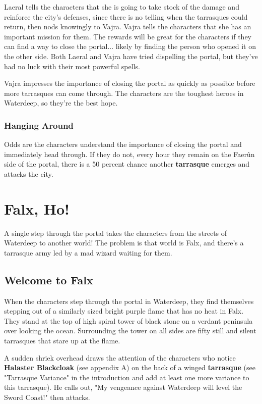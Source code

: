 \documentclass[10pt,a4paper,twoside,bg=print,twocolumn,openany,nodeprecatedcode]{dndbook}
\begin{document}
Laeral tells the characters that she is going to take stock of the damage and reinforce the city's defenses, since there is no telling when the tarrasques could return, then nods knowingly to Vajra. Vajra tells the characters that she has an important mission for them. The rewards will be great for the characters if they can find a way to close the portal... likely by finding the person who opened it on the other side. Both Laeral and Vajra have tried dispelling the portal, but they've had no luck with their most powerful spells.

Vajra impresses the importance of closing the portal as quickly as possible before more tarrasques can come through. The characters are the toughest heroes in Waterdeep, so they're the best hope.

\subsection{Hanging Around}
Odds are the characters understand the importance of closing the portal and immediately head through. If they do not, every hour they remain on the Faerûn side of the portal, there is a 50 percent chance another \textbf{tarrasque} emerges and attacks the city.

\chapter{Falx, Ho!}
A single step through the portal takes the characters from the streets of Waterdeep to another world! The problem is that world is Falx, and there's a tarrasque army led by a mad wizard waiting for them.

\section{Welcome to Falx}
When the characters step through the portal in Waterdeep, they find themselves stepping out of a similarly sized bright purple flame that has no heat in Falx. They stand at the top of high spiral tower of black stone on a verdant peninsula over looking the ocean. Surrounding the tower on all sides are fifty still and silent tarrasques that stare up at the flame.

A sudden shriek overhead draws the attention of the characters who notice \textbf{Halaster Blackcloak} (see  appendix A) on the back of a winged \textbf{tarrasque} (see  "Tarrasque Variance" in the introduction and add at  least one more variance to this tarrasque). He calls  out, "My vengeance against Waterdeep will level the Sword Coast!" then attacks.
\end{document}
